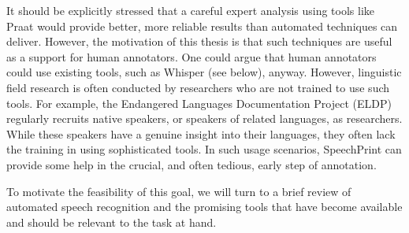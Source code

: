 It should be explicitly stressed that a careful expert analysis using tools like Praat would provide better, more reliable results than automated techniques can deliver. However, the motivation of this thesis is that such techniques are useful as a support for human annotators. One could argue that human annotators could use existing tools, such as Whisper (see below), anyway. However, linguistic field research is often conducted by researchers who are not trained to use such tools. For example, the Endangered Languages Documentation Project (ELDP) regularly recruits native speakers, or speakers of related languages, as researchers. While these speakers have a genuine insight into their languages, they often lack the training in using sophisticated tools. In such usage scenarios, SpeechPrint can provide some help in the crucial, and often tedious, early step of annotation.

To motivate the feasibility of this goal, we will turn to a brief review of automated speech recognition and the promising tools that have become available and should be relevant to the task at hand.
